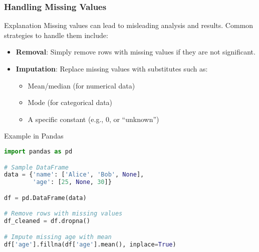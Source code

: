 \documentclass[aspectratio=169]{beamer}
\begin{document}
\begin{frame}[fragile]
  \frametitle{Handling Missing Values}
  \begin{block}{Explanation}
    Missing values can lead to misleading analysis and results. Common strategies to handle them include:
    \begin{itemize}
      \item \textbf{Removal}: Simply remove rows with missing values if they are not significant.
      \item \textbf{Imputation}: Replace missing values with substitutes such as:
        \begin{itemize}
          \item Mean/median (for numerical data)
          \item Mode (for categorical data)
          \item A specific constant (e.g., 0, or “unknown”)
        \end{itemize}
    \end{itemize}
  \end{block}

  \begin{block}{Example in Pandas}
    \begin{lstlisting}[language=Python]
import pandas as pd

# Sample DataFrame
data = {'name': ['Alice', 'Bob', None],
        'age': [25, None, 30]}

df = pd.DataFrame(data)

# Remove rows with missing values
df_cleaned = df.dropna()

# Impute missing age with mean
df['age'].fillna(df['age'].mean(), inplace=True)
    \end{lstlisting}
  \end{block}
\end{frame}
\end{document}
